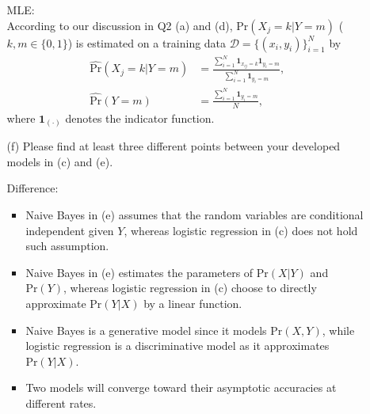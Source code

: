 \documentclass[10pt]{article}
\begin{document}
\begin{enumerate}[1.]
\begin{itemize}
{                    MLE: \\
                    According to our discussion in Q2 (a) and (d),
                    $\text{Pr}(X_j = k | Y = m)$ ($k, m\in \{0,1\}$) is estimated
                    on a training data $\mathcal{D} = \{ (x_i,y_i) \}_{i=1}^N$ by
                    \begin{align*}
                        \widehat{\text{Pr}}\left(X_{j}=k | Y=m\right) & = \frac{\sum_{i=1}^N \mathbf{1}_{x_{ij}=k} \mathbf{1}_{y_i=m}}{\sum_{i=1}^N \mathbf{1}_{y_i=m}}, \\
                        \widehat{\text{Pr}}\left(Y=m\right)           & = \frac{\sum_{i=1}^N\mathbf{1}_{y_i=m}}{N},
                    \end{align*}
                    where $\mathbf{1}_{(\cdot)}$ denotes the indicator function.
                    }
              \item[(f)] Please find at least three different points between your developed models in (c) and (e). ~   \\
                    { \color{blue}
                    Difference:
                    \begin{itemize}
                        \item Naive Bayes in (e) assumes that the random variables are conditional independent
                              given $Y$, whereas logistic regression in (c) does not hold such assumption.
                        \item Naive Bayes in (e) estimates the parameters of $\text{Pr}(X|Y)$ and $\text{Pr}(Y)$,
                              whereas logistic regression in (c) choose to directly approximate $\text{Pr}(Y|X)$ by a linear function.
                        \item Naive Bayes is a generative model since it models $\text{Pr}(X,Y)$,
                              while logistic regression is a discriminative model as it approximates $\text{Pr}(Y|X)$.
                        \item Two models will converge toward their asymptotic accuracies at different rates.
                    \end{itemize}
                    }
          \end{itemize}




\end{enumerate}
\end{document}
